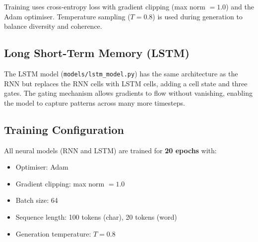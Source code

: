 Training uses cross-entropy loss with gradient clipping (max norm $= 1.0$) and
the Adam optimiser. Temperature sampling ($T = 0.8$) is used during generation
to balance diversity and coherence.

\subsection{Long Short-Term Memory (LSTM)}

The LSTM model (\texttt{models/lstm\_model.py}) has the same architecture as the
RNN but replaces the RNN cells with LSTM cells, adding a cell state and three
gates. The gating mechanism allows gradients to flow without vanishing, enabling
the model to capture patterns across many more timesteps.

\subsection{Training Configuration}

All neural models (RNN and LSTM) are trained for \textbf{20 epochs} with:
\begin{itemize}
    \item Optimiser: Adam
    \item Gradient clipping: max norm $= 1.0$
    \item Batch size: 64
    \item Sequence length: 100 tokens (char), 20 tokens (word)
    \item Generation temperature: $T = 0.8$
\end{itemize}
